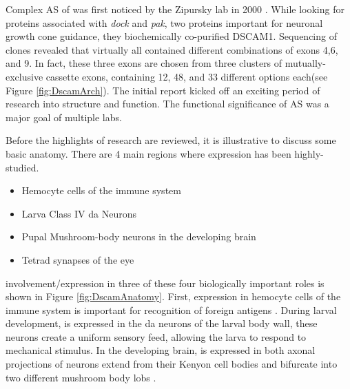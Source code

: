Complex AS of\dscam{} was first noticed by the Zipursky lab in 2000 \citep{Schmucker2000}. While looking for proteins associated with \textit{dock} and \textit{pak}, two proteins important for neuronal growth cone guidance, they biochemically co-purified DSCAM1. Sequencing of \dscam{} clones revealed that virtually all contained different combinations of exons 4,6, and 9. In fact, these three exons are chosen from three clusters of mutually-exclusive cassette exons, containing 12, 48, and 33 different options each(see Figure \ref{fig:DscamArch}). The initial report kicked off an exciting period of research into \dscam{} structure and function. The functional significance of \dscam{} AS was a major goal of multiple labs.

Before the highlights of \dscam{} research are reviewed, it is illustrative to discuss some basic \flies{} anatomy. There are 4 main regions where \dscam{} expression has been highly-studied.

\begin{itemize} \itemsep0.5pt \parskip0pt 
  \item Hemocyte cells of the immune system
  \item Larva Class IV da Neurons 
  \item Pupal Mushroom-body neurons in the developing brain
  \item Tetrad synapses of the eye
\end{itemize}

\dscam{} involvement/expression in three of these four biologically important roles is shown in Figure \ref{fig:DscamAnatomy}. First, \dscam{} expression in hemocyte cells of the immune system is important for recognition of foreign antigens \citep{Watson2005}. During larval development, \dscam{} is expressed in the da neurons of the larval body wall, these neurons create a uniform sensory feed, allowing the larva to respond to mechanical stimulus. In the developing brain, \dscam{} is expressed in both axonal projections of neurons extend from their Kenyon cell bodies and bifurcate into two different mushroom body lobs \citep{Zhan2004}. 

